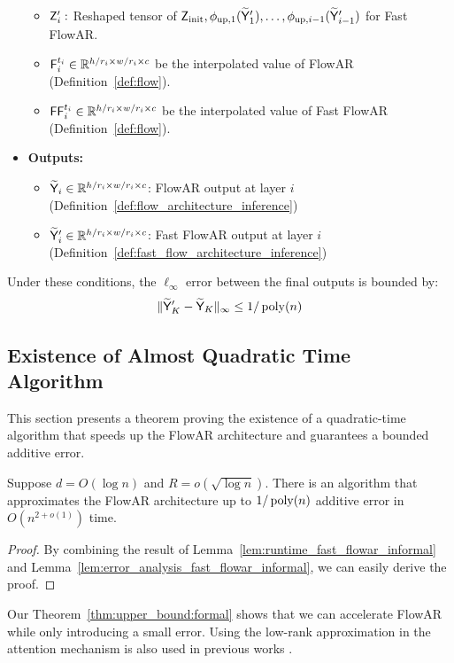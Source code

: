 \begin{lemma}
\begin{itemize}
\begin{itemize}
            \item $\mathsf{Z}'_i:$ Reshaped tensor of  $\mathsf{Z}_{\mathrm{init}}, \phi_{\mathrm{up},1}(\widetilde{\mathsf{Y}}'_1), \dots, \phi_{\mathrm{up},i-1}(\widetilde{\mathsf{Y}}'_{i-1})$ for  Fast FlowAR.
            \item $\mathsf{F}_i^{t_i} \in \mathbb{R}^{h/r_i \times w/r_i \times c}$ be the interpolated value of FlowAR (Definition~\ref{def:flow}).
            \item $\mathsf{FF}_i^{t_i} \in \mathbb{R}^{h/r_i \times w/r_i \times c}$ be the interpolated value of Fast FlowAR (Definition~\ref{def:flow}).
        \end{itemize} 
        \item {\bf Outputs:}
        \begin{itemize}
            \item $\widetilde{\mathsf{Y}}_i \in \mathbb{R}^{h/r_i \times w/r_i \times c}$: FlowAR output at layer $i$ (Definition~\ref{def:flow_architecture_inference})
            \item $\widetilde{\mathsf{Y}}'_i \in \mathbb{R}^{h/r_i \times w/r_i \times c}$: Fast FlowAR output at layer $i$ (Definition~\ref{def:fast_flow_architecture_inference})
        \end{itemize}
    \end{itemize}

    Under these conditions, the $\ell_\infty$ error between the final outputs is bounded by:
    \begin{align*}
        \|\widetilde{\mathsf{Y}}'_K - \widetilde{\mathsf{Y}}_K\|_\infty \leq 1/\operatorname{poly}(n)
    \end{align*}
    
\end{lemma}

\subsection{Existence of Almost Quadratic Time Algorithm}\label{sec:almost_quadratic_time_algorithm}
This section presents a theorem proving the existence of a quadratic-time algorithm that speeds up the FlowAR architecture and guarantees a bounded additive error.
\begin{theorem}
\label{thm:upper_bound:formal}
Suppose $d = O(\log n)$ and $R = o(\sqrt{\log n})$. There is an algorithm that approximates the  FlowAR architecture up to $1/\operatorname{poly}(n)$ additive error in $O(n^{2+o(1)})$ time.
\end{theorem}
\begin{proof}
    By combining the result of Lemma~\ref{lem:runtime_fast_flowar_informal} and Lemma~\ref{lem:error_analysis_fast_flowar_informal}, we can easily derive the proof.
\end{proof}

Our Theorem~\ref{thm:upper_bound:formal} shows that we can accelerate FlowAR while only introducing a small error. Using the low-rank approximation in the attention mechanism is also used in previous works \cite{kll+25,lls+24_conv,llss25,lss+25_relu,chl+24_rope,lss+24,lssz24_tat,as24_iclr,as24b,as24_rope,hsk+24}.